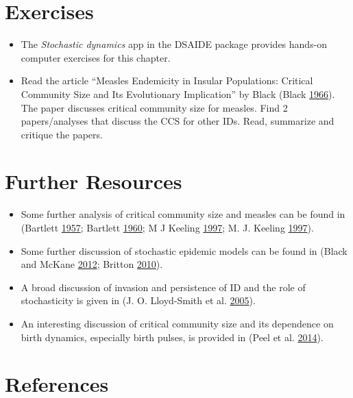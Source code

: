 \documentclass[]{book}
\providecommand{\tightlist}{%
  \setlength{\itemsep}{0pt}\setlength{\parskip}{0pt}}
\theoremstyle{definition}
\theoremstyle{definition}
\theoremstyle{definition}
\theoremstyle{remark}
\begin{document}
\section{Exercises}\label{exercises-12}

\begin{itemize}
\tightlist
\item
  The \emph{Stochastic dynamics} app in the DSAIDE package provides
  hands-on computer exercises for this chapter.
\item
  Read the article ``Measles Endemicity in Insular Populations: Critical
  Community Size and Its Evolutionary Implication'' by Black (Black
  \protect\hyperlink{ref-black66}{1966}). The paper discusses critical
  community size for measles. Find 2 papers/analyses that discuss the
  CCS for other IDs. Read, summarize and critique the papers.
\end{itemize}

\section{Further Resources}\label{further-resources-12}

\begin{itemize}
\tightlist
\item
  Some further analysis of critical community size and measles can be
  found in (Bartlett \protect\hyperlink{ref-bartlett57}{1957}; Bartlett
  \protect\hyperlink{ref-bartlett60}{1960}; M J Keeling
  \protect\hyperlink{ref-keeling97}{1997}; M. J. Keeling
  \protect\hyperlink{ref-keeling97a}{1997}).
\item
  Some further discussion of stochastic epidemic models can be found in
  (Black and McKane \protect\hyperlink{ref-black12}{2012}; Britton
  \protect\hyperlink{ref-britton10a}{2010}).
\item
  A broad discussion of invasion and persistence of ID and the role of
  stochasticity is given in (J. O. Lloyd-Smith et al.
  \protect\hyperlink{ref-lloyd-smith05b}{2005}).
\item
  An interesting discussion of critical community size and its
  dependence on birth dynamics, especially birth pulses, is provided in
  (Peel et al. \protect\hyperlink{ref-peel14}{2014}).
\end{itemize}

\section{References}\label{references-13}
\end{document}
